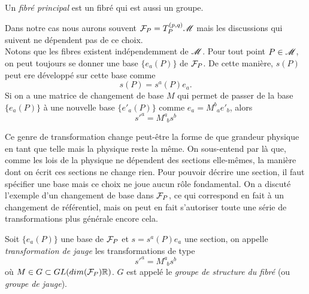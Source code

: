 \documentclass[a4paper,11pt]{report}
\begin{document}
                \begin{defn}
                    Un \textit{fibré principal} est un fibré qui est aussi un groupe.
                \end{defn}
                
                Dans notre cas nous aurons souvent $\mathcal{F}_P = T_P^{(p,q)}\mathscr{M}$ mais les discussions qui suivent ne dépendent pas de ce choix.\\
                
                Notons que les fibres existent indépendemment de $\mathscr{M}$. Pour tout point $P\in\mathscr{M}$, on peut toujours se donner une base $\{e_a(P)\}$ de $\mathcal{F}_P$. De cette manière, $s(P)$ peut ere développé sur cette base comme
                \begin{equation}
                    s(P) = s^a(P)e_a.
                \end{equation}
                Si on a une matrice de changement de base $M$ qui permet de passer de la base $\{e_a(P)\}$ à une nouvelle base $\{e'_a(P)\}$ comme $e_a = M^b_{~~a} e'_b$, alors
                \begin{equation}
                    s'^a = M^a_{~~b}s^b
                \end{equation}
                
                Ce genre de transformation change peut-être la forme de que grandeur physique en tant que telle mais la physique reste la même. On sous-entend par là que, comme les lois de la physique ne dépendent des sections elle-mêmes, la manière dont on écrit ces sections ne change rien. Pour pouvoir décrire une section, il faut spécifier une base mais ce choix ne joue aucun rôle fondamental. On a discuté l'exemple d'un changement de base dans $\mathcal{F}_P$, ce qui correspond en fait à un changement de référentiel, mais on peut en fait s'autoriser toute une série de transformations plus générale encore cela.
                
                \begin{defn}
                    Soit $\{e_a(P)\}$ une base de $\mathcal{F}_P$ et $s = s^a(P)e_a$ une section, on appelle \textit{transformation de jauge} les transformations de type
                    \begin{equation}
                    s'^a = M^a_{~~b}s^b
                    \end{equation}
                    où $M\in G\subset GL(dim(\mathcal{F}_P)\mathbb{R})$. $G$ est appelé le \textit{groupe de structure du fibré} (ou \textit{groupe de jauge}).
                \end{defn}
                
\end{document}
